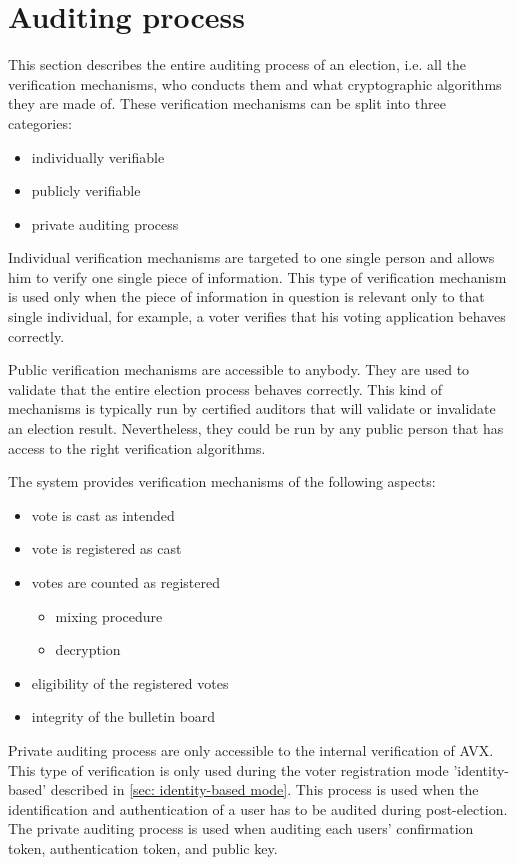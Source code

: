 \section{Auditing process} \label{sec: auditing process}
This section describes the entire auditing process of an election, i.e. all the verification mechanisms, who conducts them and what cryptographic algorithms they are made of. These verification mechanisms can be split into three categories:
\begin{itemize}
    \item individually verifiable
    \item publicly verifiable
    \item private auditing process
\end{itemize}

Individual verification mechanisms are targeted to one single person and allows him to verify one single piece of information. This type of verification mechanism is used only when the piece of information in question is relevant only to that single individual, for example, a voter verifies that his voting application behaves correctly. 

Public verification mechanisms are accessible to anybody. They are used to validate that the entire election process behaves correctly. This kind of mechanisms is typically run by certified auditors that will validate or invalidate an election result. Nevertheless, they could be run by any public person that has access to the right verification algorithms.

The system provides verification mechanisms of the following aspects:
\begin{itemize}
    \item vote is cast as intended
    \item vote is registered as cast
    \item votes are counted as registered
    \begin{itemize}
        \item mixing procedure
        \item decryption
    \end{itemize}
    \item eligibility of the registered votes
    \item integrity of the bulletin board
\end{itemize}

Private auditing process are only accessible to the internal verification of AVX. This type of verification is only used during the voter registration mode 'identity-based' described in \cref{sec: identity-based mode}. This process is used when the identification and authentication of a user has to be audited during post-election. The private auditing process is used when auditing each users' confirmation token, authentication token, and public key.
